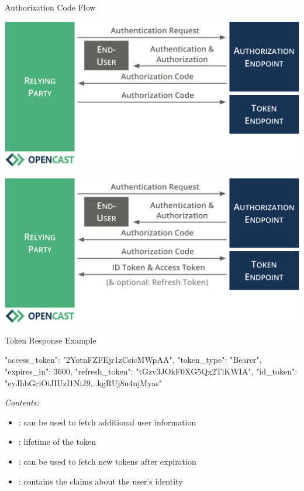 \documentclass[aspectratio=169]{beamer}
\begin{document}
\begin{frame}{Authorization Code Flow}
	\vspace*{0.2em}
	\begin{overprint}
		\centerline{\includegraphics[height=0.84\textheight]{figures/authorization-code-flow-4}}
		\centerline{\includegraphics[height=0.84\textheight]{figures/authorization-code-flow-5}}
	\end{overprint}
	\vspace{-1.8em}
\end{frame}

\begin{frame}[fragile]{Token Response Example}
\begin{jsoncode}
{
	"access_token": "2YotnFZFEjr1zCsicMWpAA",
	"token_type": "Bearer",
	"expires_in": 3600,
	"refresh_token": "tGzv3JOkF0XG5Qx2TlKWIA",
	"id_token": "eyJhbGciOiJIUzI1NiJ9...kgRUj8u4njMyas"
}
\end{jsoncode}
\vspace{2mm}
	\emph{Contents:}
	\begin{itemize}
		\item {}: can be used to fetch additional user information
		\item {}: lifetime of the token
		\item {}: can be used to fetch new tokens after expiration
		\item {}: contains the claims about the user's identity
	\end{itemize}
	\vspace*{-2mm}
\end{frame}
\end{document}
